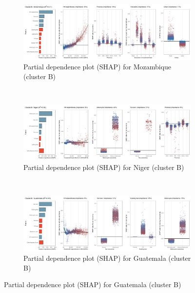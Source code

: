 \begin{figure}[ht!]\ContinuedFloat
    \centering
   \begin{subfigure}[b]{\textwidth}
         \centering
         \caption{Partial dependence plot (SHAP) for Mozambique (cluster B)}
         \label{fig:5b_MOZ}
         \includegraphics[width=\textwidth]{Figure 5b/Figure_5b_MOZ}         
     \end{subfigure}
    \\
    \vspace{0.5cm}
   \begin{subfigure}[b]{\textwidth}
         \centering
         \caption{Partial dependence plot (SHAP) for Niger (cluster B)}
         \label{fig:5b_NER}
         \includegraphics[width=\textwidth]{Figure 5b/Figure_5b_NER}         
     \end{subfigure}
    \\
    \vspace{0.5cm}
   \begin{subfigure}[b]{\textwidth}
         \centering
         \caption{Partial dependence plot (SHAP) for Guatemala (cluster B)}
         \label{fig:5b_GTM}
         \includegraphics[width=\textwidth]{Figure 5b/Figure_5b_GTM}

\end{subfigure}
\end{figure}
